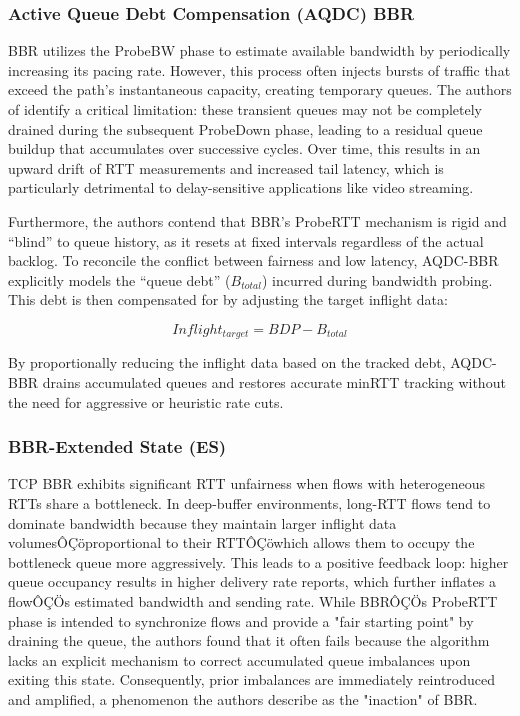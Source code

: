 \documentclass[conference]{IEEEtran}
\begin{document}
\subsubsection{Active Queue Debt Compensation (AQDC) BBR}

BBR utilizes the ProbeBW phase to estimate available bandwidth by periodically increasing its pacing rate. 
However, this process often injects bursts of traffic that exceed the path's instantaneous capacity, creating temporary queues. 
The authors of \cite{AQDCBBR} identify a critical limitation: these transient queues may not be completely drained during the subsequent ProbeDown phase, leading to a residual queue buildup that accumulates over successive cycles. 
Over time, this results in an upward drift of RTT measurements and increased tail latency, which is particularly detrimental to delay-sensitive applications like video streaming.

Furthermore, the authors contend that BBR's ProbeRTT mechanism is rigid and ``blind'' to queue history, as it resets at fixed intervals regardless of the actual backlog. 
To reconcile the conflict between fairness and low latency, AQDC-BBR explicitly models the ``queue debt'' ($B_{total}$) incurred during bandwidth probing. 
This debt is then compensated for by adjusting the target inflight data:

\begin{equation}
    Inflight_{target} = BDP - B_{total}
\end{equation}

By proportionally reducing the inflight data based on the tracked debt, AQDC-BBR drains accumulated queues and restores accurate minRTT tracking without the need for aggressive or heuristic rate cuts.

\subsubsection{BBR-Extended State (ES)}
TCP BBR exhibits significant RTT unfairness when flows with heterogeneous RTTs share a bottleneck\cite{BBRES}. 
In deep-buffer environments, long-RTT flows tend to dominate bandwidth because they maintain larger inflight data volumesÔÇöproportional to their RTTÔÇöwhich allows them to occupy the bottleneck queue more aggressively. 
This leads to a positive feedback loop: higher queue occupancy results in higher delivery rate reports, which further inflates a flowÔÇÖs estimated bandwidth and sending rate. 
While BBRÔÇÖs ProbeRTT phase is intended to synchronize flows and provide a "fair starting point" by draining the queue, the authors found that it often fails because the algorithm lacks an explicit mechanism to correct accumulated queue imbalances upon exiting this state. 
Consequently, prior imbalances are immediately reintroduced and amplified, a phenomenon the authors describe as the "inaction" of BBR.
\end{document}
